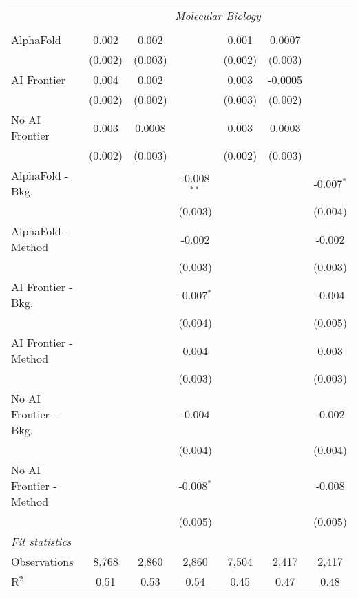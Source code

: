 \begin{tabular}{lcccccc}
 & \multicolumn{6}{c}{\textit{Molecular Biology}} \\ \\
   AlphaFold               & 0.002   & 0.002   &               & 0.001   & 0.0007  &   \\   
                           & (0.002) & (0.003) &               & (0.002) & (0.003) &   \\   
   AI Frontier             & 0.004   & 0.002   &               & 0.003   & -0.0005 &   \\   
                           & (0.002) & (0.002) &               & (0.003) & (0.002) &   \\   
   No AI Frontier          & 0.003   & 0.0008  &               & 0.003   & 0.0003  &   \\   
                           & (0.002) & (0.003) &               & (0.002) & (0.003) &   \\   
   AlphaFold - Bkg.        &         &         & -0.008$^{**}$ &         &         & -0.007$^{*}$\\   
                           &         &         & (0.003)       &         &         & (0.004)\\   
   AlphaFold - Method      &         &         & -0.002        &         &         & -0.002\\   
                           &         &         & (0.003)       &         &         & (0.003)\\   
   AI Frontier - Bkg.      &         &         & -0.007$^{*}$  &         &         & -0.004\\   
                           &         &         & (0.004)       &         &         & (0.005)\\   
   AI Frontier - Method    &         &         & 0.004         &         &         & 0.003\\   
                           &         &         & (0.003)       &         &         & (0.003)\\   
   No AI Frontier - Bkg.   &         &         & -0.004        &         &         & -0.002\\   
                           &         &         & (0.004)       &         &         & (0.004)\\   
   No AI Frontier - Method &         &         & -0.008$^{*}$  &         &         & -0.008\\   
                           &         &         & (0.005)       &         &         & (0.005)\\   
   \midrule
   \emph{Fit statistics}\\
   Observations            & 8,768   & 2,860   & 2,860         & 7,504   & 2,417   & 2,417\\  
   R$^2$                   & 0.51    & 0.53    & 0.54          & 0.45    & 0.47    & 0.48\\  
   

\end{tabular}
